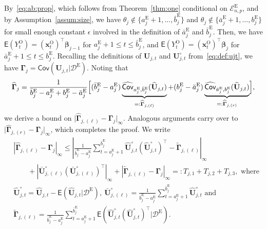 \documentclass[11pt, a4paper]{article}
\newcommand{\mbf}{\mathbf}
\newcommand{\mc}{\mathcal}
\renewcommand{\l}{\left}
\renewcommand{\r}{\right}
\def\wh{\widehat}
\def\wt{\widetilde}
\newcommand{\cp}{\theta}
\newcommand{\E}[0]{\mathsf{E}}
\newcommand{\Cov}[0]{\mathsf{Cov}}
\newcommand{\nn}{\nonumber}
\newcommand{\tE}{\text{E}}
\newcommand{\tO}{\text{O}}
\theoremstyle{definition}
\theoremstyle{definition}
\theoremstyle{definition}
\theoremstyle{definition}
\theoremstyle{definition}
\theoremstyle{remark}
\theoremstyle{definition}
\theoremstyle{definition}
\theoremstyle{definition}
\begin{document}
By~\eqref{eq:ab:prop}, which follows from Theorem~\ref{thm:one} conditional on $\mc E^{\tE}_{n, p}$, and by Assumption~\ref{assum:size}, we have $\cp_j \notin \{a^{\tE}_j + 1, \ldots, \bar{b}^{\tE}_j\}$ and $\cp_j \notin \{\bar{a}^{\tE}_j + 1, \ldots, b^{\tE}_j\}$ for small enough constant $\epsilon$ involved in the definition of $\bar{a}^{\tE}_j$ and $\bar{b}^{\tE}_j$.
Then, we have $\E(Y^{\tO}_t) = (\mbf x_t^{\tO})^\top \bm\beta_{j - 1}$ for $a^{\tE}_j + 1 \le t \le \bar{b}^{\tE}_j$, and $\E(Y^{\tO}_t) = (\mbf x_t^{\tO})^\top \bm\beta_j$ for $\bar{a}^{\tE}_j + 1 \le t \le b^{\tE}_j$.
Recalling the definitions of $\mbf U_{j, t}$ and $\mbf U^{\circ}_{j, t}$ from~\eqref{eq:def:ujt}, we have $\bm\Gamma_j = \Cov(\mbf U_{j, t} \vert \mc D^{\tE})$.
Noting that
\begin{align*}
\wh{\bm\Gamma}_j = \frac{1}{\bar{b}^{\tE}_j - a^{\tE}_j + b^{\tE}_j - \bar{a}^{\tE}_j} \Bigl[ (\bar{b}^{\tE}_j - a^{\tE}_j) \underbrace{\wh{\Cov}_{a^{\tE}_j, \bar{b}^{\tE}_j} (\wh{\mbf U}_{j, t})}_{=: \wh{\bm\Gamma}_{j, (\ell)}} + (b^{\tE}_j - \bar{a}^{\tE}_j) \underbrace{\wh{\Cov}_{\bar{a}^{\tE}_j, b^{\tE}_j} (\wh{\mbf U}_{j, t})}_{=: \wh{\bm\Gamma}_{j, (r)}} \Bigr],
\end{align*}
we derive a bound on $\vert \wh{\bm\Gamma}_{j, (\ell)} - \bm\Gamma_j \vert_\infty$. 
Analogous arguments carry over to $\vert \wh{\bm\Gamma}_{j, (r)} - \bm\Gamma_j \vert_\infty$, which completes the proof. 
We write
\begin{align}
& \l\vert \wh{\bm\Gamma}_{j, (\ell)} - \bm\Gamma_j \r\vert_\infty \le \l\vert \frac{1}{\bar{b}^{\tE}_j - a^{\tE}_j} \sum_{t = a^{\tE}_j + 1}^{\bar{b}^{\tE}_j} \wh{\mbf U}^\circ_{j, t} (\wh{\mbf U}^\circ_{j, t})^\top - \wt{\bm\Gamma}_{j, (\ell)}\r\vert_\infty
\nn \\
& \qquad + \l\vert \bar{\mbf U}^\circ_{j, (\ell)} (\bar{\mbf U}^\circ_{j, (\ell)})^\top \r\vert_\infty
+ \l\vert \wt{\bm\Gamma}_{j, (\ell)} - \bm\Gamma_j \r\vert_\infty =: T_{j, 1} + T_{j, 2} + T_{j, 3}, \text{ where} \label{eq:prop:G}
\\
& \wh{\mbf U}^\circ_{j, t} = \wh{\mbf U}_{j, t} - \E(\wh{\mbf U}_{j, t} \vert \mc D^{\tE}), \  
\bar{\mbf U}^\circ_{j, (\ell)} = \frac{1}{\bar{b}^{\tE}_j - a^{\tE}_j} \sum_{t = a^{\tE}_j + 1}^{\bar{b}^{\tE}_j} \wh{\mbf U}^\circ_{j, t} \text{ \ and}
\nn \\
& \wt{\bm\Gamma}_{j, (\ell)} = \frac{1}{\bar{b}^{\tE}_j - a^{\tE}_j} \sum_{t = a^{\tE}_j + 1}^{\bar{b}^{\tE}_j} \E\l( \wh{\mbf U}^\circ_{j, t} (\wh{\mbf U}^\circ_{j, t})^\top \big \vert \mc D^{\tE}\r).
\nn
\end{align}
\end{document}
